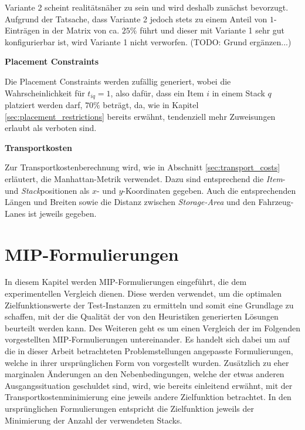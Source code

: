 Variante 2 scheint realitätsnäher zu sein und wird deshalb zunächst bevorzugt. Aufgrund der Tatsache, dass Variante 2 jedoch stets
zu einem Anteil von $1$-Einträgen in der Matrix von ca. $25\%$ führt und dieser mit Variante 1 sehr gut konfigurierbar ist, wird Variante 1 nicht verworfen. (TODO: Grund ergänzen...)

\textbf{Placement Constraints}

Die Placement Constraints werden zufällig generiert, wobei die Wahrscheinlichkeit für $t_{iq} = 1$, also dafür,
dass ein Item $i$ in einem Stack $q$ platziert werden darf, $70 \%$ beträgt, da, wie in Kapitel \ref{sec:placement_restrictions} bereits erwähnt, tendenziell mehr Zuweisungen erlaubt als verboten sind.

\textbf{Transportkosten}

Zur Transportkostenberechnung wird, wie in Abschnitt \ref{sec:transport_costs} erläutert, die Manhattan-Metrik verwendet. Dazu sind
entsprechend die \textit{Item}- und \textit{Stack}positionen als $x$- und $y$-Koordinaten gegeben. Auch die entsprechenden Längen und Breiten sowie die Distanz zwischen \textit{Storage-Area} und den Fahrzeug-Lanes ist jeweils gegeben.

\pagebreak

\section{MIP-Formulierungen}
\label{sec:mip_formulations}

In diesem Kapitel werden MIP-Formulierungen eingeführt, die dem experimentellen Vergleich dienen.
Diese werden verwendet, um die optimalen Zielfunktionswerte der Test-Instanzen zu ermitteln und somit eine Grundlage zu schaffen, mit der die Qualität der von den Heuristiken generierten Lösungen beurteilt werden kann. Des Weiteren geht es um einen Vergleich der im Folgenden vorgestellten MIP-Formulierungen untereinander.
Es handelt sich dabei um auf die in dieser Arbeit betrachteten Problemstellungen angepasste Formulierungen,
welche in ihrer ursprünglichen Form von \citet{Le2016} vorgestellt wurden.
Zusätzlich zu eher marginalen Änderungen an den Nebenbedingungen, welche der etwas anderen Ausgangssituation geschuldet sind,
wird, wie bereits einleitend erwähnt, mit der Transportkostenminimierung eine jeweils andere Zielfunktion betrachtet.
In den ursprünglichen Formulierungen entspricht die Zielfunktion jeweils der Minimierung der Anzahl der verwendeten Stacks.

